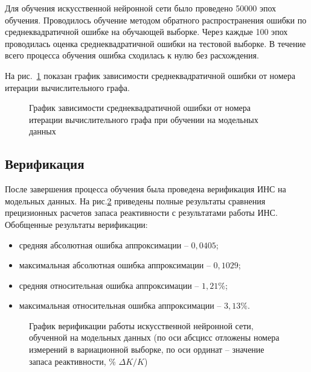Для обучения искусственной нейронной сети было проведено 50000 эпох обучения.
Проводилось обучение методом обратного распространения ошибки по среднеквадратичной ошибке на обучающей выборке.
Через каждые 100 эпох проводилась оценка среднеквадратичной ошибки на тестовой выборке.
В течение всего процесса обучения ошибка сходилась к нулю без расхождения.

На рис.~\ref{pic:model-data-loss} показан график зависимости среднеквадратичной ошибки от номера итерации вычислительного графа.

\begin{figure}[p]
    \caption[График среднеквадратичной ошибки ИНС на модельных данных]{График зависимости среднеквадратичной ошибки от номера итерации вычислительного графа при обучении на модельных данных}
    \label{pic:model-data-loss}
\end{figure}


\subsection{Верификация}

После завершения процесса обучения была проведена верификация ИНС на модельных данных.
На рис.\ref{pic:model-rus} приведены полные результаты сравнения прецизионных расчетов запаса реактивности с результатами работы ИНС.
Обобщенные результаты верификации:

\begin{itemize}
\item
  средняя абсолютная ошибка аппроксимации -- $0,0405$;
\item
  максимальная абсолютная ошибка аппроксимации -- $0,1029$;
\item
  средняя относительная ошибка аппроксимации -- $1,21\%$;
\item
  максимальная относительная ошибка аппроксимации -- $3,13\%$.
\end{itemize}

\begin{figure}[p]
    \caption[График верификации ИНС на модельных данных]{График верификации работы искусственной нейронной сети, обученной на модельных данных (по оси абсцисс отложены номера измерений в вариационной выборке, по оси ординат -- значение запаса реактивности,
    \% $\Delta K/K$)}
    \label{pic:model-rus}
\end{figure}

